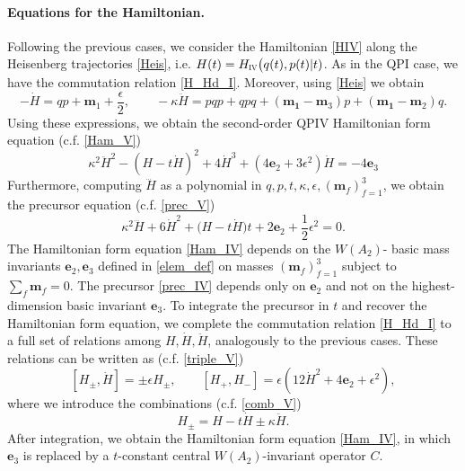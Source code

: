 \documentclass[12pt,a4paper]{article}
\numberwithin{equation}{section}
\newcommand{\IV}{\scalebox{.6}{IV}}
\begin{document}
\paragraph{Equations for the Hamiltonian.}
Following the previous cases, we consider the Hamiltonian \eqref{HIV} along the Heisenberg  trajectories \eqref{Heis}, i.e.  
$H(t)=H_{\IV}\big(q(t),p(t)|t)$. As in the QPI case, we have the commutation relation \eqref{H_Hd_I}. Moreover, using \eqref{Heis} we obtain
\begin{equation}\label{Hder_IV}
-\dot{H}=qp+\boldsymbol{m}_1+\frac{\epsilon}2, \qquad -\kappa\ddot{H}=pqp+qpq+(\boldsymbol{m_1}{-}\boldsymbol{m}_3)p+(\boldsymbol{m_1}{-}\boldsymbol{m}_2)q.
\end{equation}
Using these expressions, we obtain the second-order QPIV Hamiltonian form equation (c.f. \eqref{Ham_V})
\begin{equation}\label{Ham_IV}
\kappa^2\ddot{H}^2-(H-t\dot{H})^2+4\dot{H}^3+(4\boldsymbol{e}_2{+}3\epsilon^2)\dot{H}=-4\boldsymbol{e}_3
\end{equation}
Furthermore, computing $\dddot{H}$ as a polynomial in $q,p,t,\kappa,\epsilon,(\boldsymbol{m}_f)_{f=1}^3$, we obtain the precursor equation (c.f. \eqref{prec_V})
\begin{equation}\label{prec_IV}
\kappa^2\dddot{H}+6\dot{H}^2+\big(H-t\dot{H}\big)t+2\boldsymbol{e}_2{+}\frac12\epsilon^2=0.
\end{equation} 
The Hamiltonian form equation \eqref{Ham_IV} depends on the $W(A_2)$- basic mass invariants $\boldsymbol{e}_2,\boldsymbol{e}_3$ defined in \eqref{elem_def} on masses $(\boldsymbol{m}_f)_{f=1}^3$ subject to  $\sum_f\boldsymbol{m}_f=0$. The precursor \eqref{prec_IV} depends only on $\boldsymbol{e}_2$ and not on the highest-dimension basic invariant $\boldsymbol{e}_3$.
To integrate the precursor in $t$ and recover the Hamiltonian form equation, we complete the commutation relation \eqref{H_Hd_I} to a full set of relations among $H,\dot{H},\ddot{H}$, analogously to the previous cases. These relations can be written as (c.f. \eqref{triple_V})
\begin{equation}\label{triple_IV}
[H_\pm,\dot{H}]=\pm\epsilon H_\pm, \qquad [H_+,H_-]=\epsilon\left(12\dot{H}^2+4\boldsymbol{e}_2{+}\epsilon^2\right),
\end{equation}
where we introduce the combinations (c.f. \eqref{comb_V})
\begin{equation}
H_\pm=H-t\dot{H}\pm\kappa\ddot{H}.    
\end{equation}
After integration, we obtain the Hamiltonian form equation \eqref{Ham_IV}, in which $\boldsymbol{e}_3$ is replaced by a $t$-constant central $W(A_2)$-invariant operator $C$.
\end{document}
